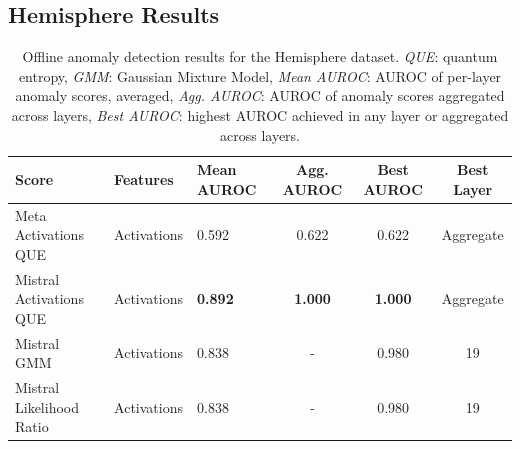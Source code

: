 \subsection{Hemisphere Results}

\begin{table}[H]
\centering
\scriptsize  %
\renewcommand{\arraystretch}{1.2}  %
\setlength{\tabcolsep}{2pt}  %
\begin{tabular}{lp{3cm}lccc}
\toprule
\textbf{Score} & \textbf{Features} & \textbf{Mean AUROC} & \textbf{Agg. AUROC} & \textbf{Best AUROC} & \textbf{Best Layer} \\
\midrule
Meta Activations QUE             & Activations & 0.592  & 0.622  & 0.622  & Aggregate \\ 
Mistral Activations QUE          & Activations & \textbf{0.892}  & \textbf{1.000}  & \textbf{1.000}  & Aggregate \\ 
Mistral GMM & Activations & 0.838  & -      & 0.980  & 19 \\ 
Mistral Likelihood Ratio         & Activations & 0.838  & -      & 0.980  & 19 \\ 
\bottomrule
\end{tabular}
\caption{Offline anomaly detection results for the Hemisphere dataset. \emph{QUE}: quantum entropy, \emph{GMM}: Gaussian Mixture Model, \emph{Mean AUROC}: AUROC of per-layer anomaly scores, averaged, \emph{Agg. AUROC}: AUROC of anomaly scores aggregated across layers, \emph{Best AUROC}: highest AUROC achieved in any layer or aggregated across layers.}
\label{tab:offline_anomaly_hemisphere}
\end{table}

